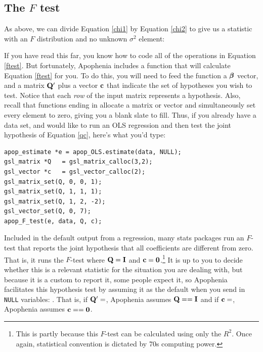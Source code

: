 \subsection{The $F$ test}\label{ftestsec}

As above, we can divide Equation \ref{chi1} by Equation \ref{chi2}
to give us a statistic with an $F$ distribution and no unknown
$\sigma^2$ element:


\startonecol
{}
\endonecol

If you have read this far, you know how to code all of the operations
in Equation \ref{ftest}.  But fortunately, 
Apophenia includes a function that will calculate Equation \ref{ftest}
for you.
To do this, you will need to feed the function a ${\mbox{\boldmath$\beta$}}$ vector, and a
matrix ${\bf Q}'$ plus a vector ${\bf c}$ that indicate the set of hypotheses
you wish to test. Notice that each {\em row} of the input matrix represents a
hypothesis. Also, recall that functions ending in  allocate
a matrix or vector and simultaneously set every element to zero, giving
you a blank slate to fill. Thus, if you already have a data set, and
would like to run an OLS regression and then test the joint hypothesis
of Equation \ref{qc}, here's what you'd type:
\begin{lstlisting}
apop_estimate *e = apop_OLS.estimate(data, NULL);
gsl_matrix *Q   = gsl_matrix_calloc(3,2);
gsl_vector *c   = gsl_vector_calloc(2);
gsl_matrix_set(Q, 0, 0, 1);
gsl_matrix_set(Q, 1, 1, 1);
gsl_matrix_set(Q, 1, 2, -2);
gsl_vector_set(Q, 0, 7);
apop_F_test(e, data, Q, c);
\end{lstlisting}

Included in the default output from a regression,
many stats packages run an $F$-test that reports the
joint hypothesis that all coefficients are different from zero. That is,
it runs the $F$-test where ${\bf Q} = {\bf I}$ and ${\bf c} = {\bf 0}$.\footnote{This is
partly because this $F$-test can be calculated using only the $R^2$.
Once again, statistical convention is dictated by 70s computing power.
}
It is up to you
to decide whether this is a relevant statistic for the situation you are
dealing with, but because it is a custom to report it, some
people expect it, so Apophenia facilitates this hypothesis test by
assuming it as the default when you send in {\tt NULL} variables:
. That is,
if ${\bf Q}'=$, Apophenia assumes ${\bf Q}=={\bf I}$ and if
${\bf c}=$, Apophenia assumes ${\bf c} == {\bf 0}$.




